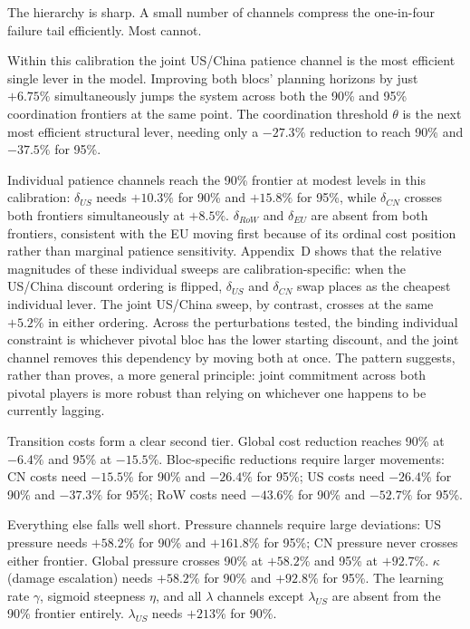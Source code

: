 \documentclass[10pt,a4paper]{article}
\begin{document}
The hierarchy is sharp. A small number of channels compress the one-in-four failure tail efficiently. Most cannot.

Within this calibration the joint US/China patience channel is the most efficient single lever in the model. Improving both blocs' planning horizons by just $+6.75\%$ simultaneously jumps the system across both the 90\% and 95\% coordination frontiers at the same point. The coordination threshold $\theta$ is the next most efficient structural lever, needing only a $-27.3\%$ reduction to reach 90\% and $-37.5\%$ for 95\%.

Individual patience channels reach the 90\% frontier at modest levels in this calibration: $\delta_{US}$ needs $+10.3\%$ for 90\% and $+15.8\%$ for 95\%, while $\delta_{CN}$ crosses both frontiers simultaneously at $+8.5\%$. $\delta_{RoW}$ and $\delta_{EU}$ are absent from both frontiers, consistent with the EU moving first because of its ordinal cost position rather than marginal patience sensitivity. Appendix~D shows that the relative magnitudes of these individual sweeps are calibration-specific: when the US/China discount ordering is flipped, $\delta_{US}$ and $\delta_{CN}$ swap places as the cheapest individual lever. The joint US/China sweep, by contrast, crosses at the same $+5.2\%$ in either ordering. Across the perturbations tested, the binding individual constraint is whichever pivotal bloc has the lower starting discount, and the joint channel removes this dependency by moving both at once. The pattern suggests, rather than proves, a more general principle: joint commitment across both pivotal players is more robust than relying on whichever one happens to be currently lagging.

Transition costs form a clear second tier. Global cost reduction reaches 90\% at $-6.4\%$ and 95\% at $-15.5\%$. Bloc-specific reductions require larger movements: CN costs need $-15.5\%$ for 90\% and $-26.4\%$ for 95\%; US costs need $-26.4\%$ for 90\% and $-37.3\%$ for 95\%; RoW costs need $-43.6\%$ for 90\% and $-52.7\%$ for 95\%.

Everything else falls well short. Pressure channels require large deviations: US pressure needs $+58.2\%$ for 90\% and $+161.8\%$ for 95\%; CN pressure never crosses either frontier. Global pressure crosses 90\% at $+58.2\%$ and 95\% at $+92.7\%$. $\kappa$ (damage escalation) needs $+58.2\%$ for 90\% and $+92.8\%$ for 95\%. The learning rate $\gamma$, sigmoid steepness $\eta$, and all $\lambda$ channels except $\lambda_{US}$ are absent from the 90\% frontier entirely. $\lambda_{US}$ needs $+213\%$ for 90\%.
\end{document}
